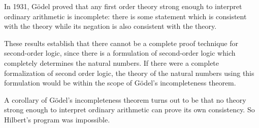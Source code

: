 \documentclass[12pt]{article}
\begin{document}
\begin{description}
In 1931, G\"odel proved that any first order theory strong enough to interpret ordinary arithmetic is incomplete:  there is some statement which is consistent with the theory while its negation is also consistent with the theory.  

These results establish that there cannot be a complete proof technique for second-order logic, since there is a formulation of second-order logic which completely determines the natural numbers.  If there were a complete formalization of second order logic, the theory of the natural numbers using this formulation would be within the scope of G\"odel's incompleteness theorem.

A corollary of G\"odel's incompleteness theorem turns out to be that no theory strong enough to interpret ordinary arithmetic can prove its own consistency.  So Hilbert's program was impossible.


\end{description}
\end{document}
